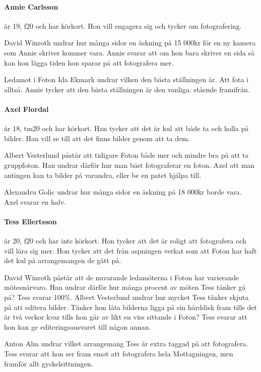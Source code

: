 \documentclass[hidelinks]{sektionsmote}
\begin{document}
\paragraph{Annie Carlsson} är 19, f20 och har körkort.
Hon vill engagera sig och tycker om fotografering.

David Winroth undrar hur många sidor en äskning på 15 000kr för en ny kamera som Annie skriver kommer vara.
Annie svarar att om hon bara skriver en sida så kan hon lägga tiden hon sparar på att fotografera mer.

Ledamot i Foton Ida Ekmark undrar vilken den bästa ställningen är.
Att fota i alltså.
Annie tycker att den bästa ställningen är den vanliga: stående framifrån.

\paragraph{Axel Flordal} är 18, tm20 och har körkort.
Han tycker att det är kul att både ta och kolla på bilder.
Han vill se till att det finns bilder genom att ta dem.

Albert Vesterlund påstår att tidigare Foton både mer och mindre bra på att ta gruppfoton.
Han undrar därför hur man bäst fotograferar en foton.
Axel att man antingen kan ta bilder på varandra, eller be en patet hjälpa till.

Alexandru Golic undrar hur många sidor en äskning på 18 000kr borde vara.
Axel svarar en halv.

\paragraph{Tess Ellertsson} är 20, f20 och har inte körkort.
Hon tycker att det är roligt att fotografera och vill lära sig mer.
Hon tycker att det från aspningen verkat som att Foton har haft det kul på arrangemangen de gått på.

David Winroth påstår att de nuvarande ledamöterna i Foton har varierande mötesnärvaro.
Han undrar därför hur många procent av möten Tess tänker gå på?
Tess svarar 100\%.
Albert Vesterlund undrar hur mycket Tess tänker skjuta på att editera bilder.
Tänker hon låta bilderna ligga på sin hårddisk fram tills det är två veckor kvar tills hon går av likt en viss sittande i Foton?
Tess svarar att hon kan ge editeringsansvaret till någon annan.

Anton Alm undrar vilket arrangemang Tess är extra taggad på att fotografera.
Tess svarar att hon ser fram emot att fotografera hela Mottagningen, men framför allt gyckelsittningen.
\end{document}

